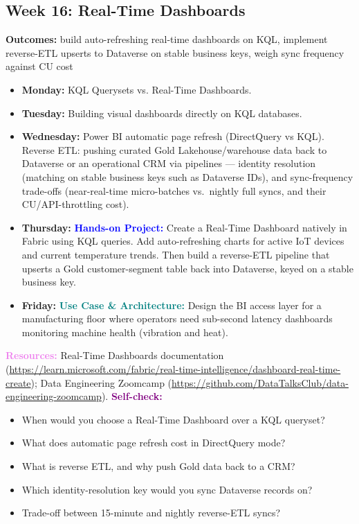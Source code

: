 \documentclass[11pt, a4paper]{article}
\newcommand{\project}[1]{\vspace{1mm}\noindent\textbf{\textcolor{blue}{Hands-on Project:}} #1}
\newcommand{\usecase}[1]{\vspace{1mm}\noindent\textbf{\textcolor{teal}{Use Case \& Architecture:}} #1}
\newcommand{\dayitem}[2]{\item \textbf{#1:} #2}
\newcommand{\resources}[1]{\vspace{1mm}\noindent\textbf{\textcolor{violet}{Resources:}} #1}
\newcommand{\selfcheck}[1]{\vspace{1mm}\noindent\textbf{\textcolor{purple}{Self-check:}} #1}
\begin{document}
\subsection*{Week 16: Real-Time Dashboards}
\par\noindent\textbf{Outcomes:} build auto-refreshing real-time dashboards on KQL, implement reverse-ETL upserts to Dataverse on stable business keys, weigh sync frequency against CU cost
\begin{itemize}[label=-]
    \dayitem{Monday}{KQL Querysets vs. Real-Time Dashboards.}
    \dayitem{Tuesday}{Building visual dashboards directly on KQL databases.}
    \dayitem{Wednesday}{Power BI automatic page refresh (DirectQuery vs KQL). Reverse ETL: pushing curated Gold Lakehouse/warehouse data back to Dataverse or an operational CRM via pipelines --- identity resolution (matching on stable business keys such as Dataverse IDs), and sync-frequency trade-offs (near-real-time micro-batches vs.\ nightly full syncs, and their CU/API-throttling cost).}
    \dayitem{Thursday}{\project{Create a Real-Time Dashboard natively in Fabric using KQL queries. Add auto-refreshing charts for active IoT devices and current temperature trends. Then build a reverse-ETL pipeline that upserts a Gold customer-segment table back into Dataverse, keyed on a stable business key.}}
    \dayitem{Friday}{\usecase{Design the BI access layer for a manufacturing floor where operators need sub-second latency dashboards monitoring machine health (vibration and heat).}}
\end{itemize}
\resources{Real-Time Dashboards documentation (\url{https://learn.microsoft.com/fabric/real-time-intelligence/dashboard-real-time-create}); Data Engineering Zoomcamp (\url{https://github.com/DataTalksClub/data-engineering-zoomcamp}).}
\selfcheck{
\begin{itemize}[label=$\bullet$, leftmargin=6mm, itemsep=0pt]
    \item When would you choose a Real-Time Dashboard over a KQL queryset?
    \item What does automatic page refresh cost in DirectQuery mode?
    \item What is reverse ETL, and why push Gold data back to a CRM?
    \item Which identity-resolution key would you sync Dataverse records on?
    \item Trade-off between 15-minute and nightly reverse-ETL syncs?
\end{itemize}
}
\end{document}
